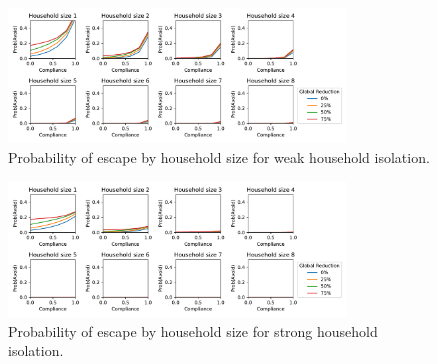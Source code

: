\documentclass[10pt,a4paper]{article}
\begin{document}
\begin{figure}[H]
\begin{center}
  \includegraphics[width=0.8\textwidth]{figures/prob_avoid_weak.pdf}
\end{center}
\caption{Probability of escape by household size for weak household isolation.}
\end{figure}

\begin{figure}[H]
\begin{center}
  \includegraphics[width=0.8\textwidth]{figures/prob_avoid_strong.pdf}
\end{center}
\caption{Probability of escape by household size for strong household isolation.}
\end{figure}

\clearpage
\end{document}
